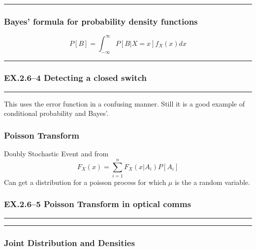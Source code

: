 \documentclass[a4paper]{article}
\begin{document}
\hrule

\subsubsection*{Bayes' formula for probability density functions}\label{ssub:bayes_formula_for_probability_density_functions}
$$P[B]=\int_{-\infty}^\infty P[B|X=x]f_X(x)dx$$

\hrule


\subsubsection*{EX.\@ 2.6--4 Detecting a closed switch}\label{ssub:poisson_conditioned_on_even}
\hrule\vspace{2mm}

This uses the error function in a confusing manner. Still it is a good example of conditional probability and Bayes'.


\subsubsection*{Poisson Transform}\label{ssub:poisson_transform}
Doubly Stochastic Event and from 
$$F_X(x)=\sum_{i=1}^{n}F_X(x|A_i)P[A_i]$$
Can get a distribution for a poisson process for which $\mu$ is the a random variable.

\subsubsection*{EX.\@ 2.6--5 Poisson Transform in optical comms}\label{ssub:ex_@_2_6_5_poisson_transform}
\hrule\vspace{2mm}
\hrule

\subsubsection{Joint Distribution and Densities}\label{ssub:joint_distribution_and_densities}













  
\end{document}
